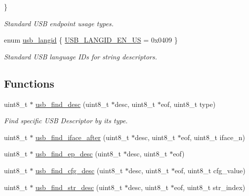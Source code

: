 \begin{DoxyCompactItemize}
 \}\begin{DoxyCompactList}\small\item\em Standard U\+SB endpoint usage types. \end{DoxyCompactList}
\item 
enum \hyperlink{group__usb__protocol__group_ga1f92deaf695c06566999f0c5343978c1}{usb\+\_\+langid} \{ \hyperlink{group__usb__protocol__group_gga1f92deaf695c06566999f0c5343978c1a8acad914e2d28c9bb1d2d3cc74c5b39e}{U\+S\+B\+\_\+\+L\+A\+N\+G\+I\+D\+\_\+\+E\+N\+\_\+\+US} = 0x0409
 \}\begin{DoxyCompactList}\small\item\em Standard U\+SB language I\+Ds for string descriptors. \end{DoxyCompactList}
\end{DoxyCompactItemize}
\subsection*{Functions}
\begin{DoxyCompactItemize}
\item 
uint8\+\_\+t $\ast$ \hyperlink{group__usb__protocol__group_ga18a090f372b76fbdb9de0e56b5f0fd91}{usb\+\_\+find\+\_\+desc} (uint8\+\_\+t $\ast$desc, uint8\+\_\+t $\ast$eof, uint8\+\_\+t type)
\begin{DoxyCompactList}\small\item\em Find specific U\+SB Descriptor by its type. \end{DoxyCompactList}\item 
uint8\+\_\+t $\ast$ \hyperlink{group__usb__protocol__group_ga551acaf5b1e20b719ba590f6a6539c10}{usb\+\_\+find\+\_\+iface\+\_\+after} (uint8\+\_\+t $\ast$desc, uint8\+\_\+t $\ast$eof, uint8\+\_\+t iface\+\_\+n)
\item 
uint8\+\_\+t $\ast$ \hyperlink{group__usb__protocol__group_ga8f56a203b361e0acc32e3f48e7ccfe9e}{usb\+\_\+find\+\_\+ep\+\_\+desc} (uint8\+\_\+t $\ast$desc, uint8\+\_\+t $\ast$eof)
\item 
uint8\+\_\+t $\ast$ \hyperlink{group__usb__protocol__group_ga46b136c975b5c0b24d9292eb0db100d6}{usb\+\_\+find\+\_\+cfg\+\_\+desc} (uint8\+\_\+t $\ast$desc, uint8\+\_\+t $\ast$eof, uint8\+\_\+t cfg\+\_\+value)
\item 
uint8\+\_\+t $\ast$ \hyperlink{group__usb__protocol__group_ga651d6393a33f3c95103fb35bce1b5466}{usb\+\_\+find\+\_\+str\+\_\+desc} (uint8\+\_\+t $\ast$desc, uint8\+\_\+t $\ast$eof, uint8\+\_\+t str\+\_\+index)
\end{DoxyCompactItemize}
